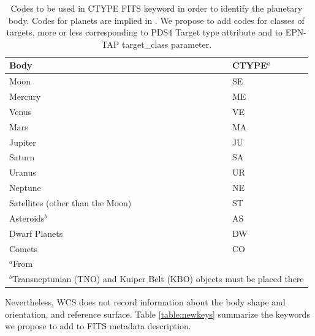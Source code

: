 \begin{table}
\caption{Codes to be used in CTYPE FITS keyword in order to identify the planetary body.
Codes for planets are implied in \citet{calagreisenI}.
We propose to add codes for classes of targets,
more or less corresponding to PDS4 Target type attribute and to EPN-TAP
target\_class parameter.}
\centering
\begin{tabular}{l l}
\hline
Body & CTYPE$^{a}$ \\ 
\hline
Moon & SE \\
Mercury & ME \\
Venus & VE \\
Mars & MA \\
Jupiter & JU \\
Saturn & SA \\
Uranus & UR \\
Neptune & NE \\
Satellites (other than the Moon) & ST \\
Asteroids$^{b}$ & AS \\
Dwarf Planets & DW \\
Comets & CO \\
\hline
\multicolumn{2}{l}{$^{a}$From \citet{calagreisenI}} \\
\multicolumn{2}{l}{$^{b}$Transneptunian (TNO) and Kuiper Belt (KBO) objects must be placed there}
\end{tabular}
\label{table:ctype}
\end{table}

Nevertheless, WCS does not record information about the body shape and
orientation, and reference surface.
Table \ref{table:newkeys} summarize the keywords we propose to add to FITS metadata description.

